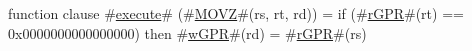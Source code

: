 function clause #\hyperref[zexecute]{execute}# (#\hyperref[zMOVZ]{MOVZ}#(rs, rt, rd)) =
  {
    if (#\hyperref[zrGPR]{rGPR}#(rt) == 0x0000000000000000) then
      #\hyperref[zwGPR]{wGPR}#(rd) = #\hyperref[zrGPR]{rGPR}#(rs)
  }
